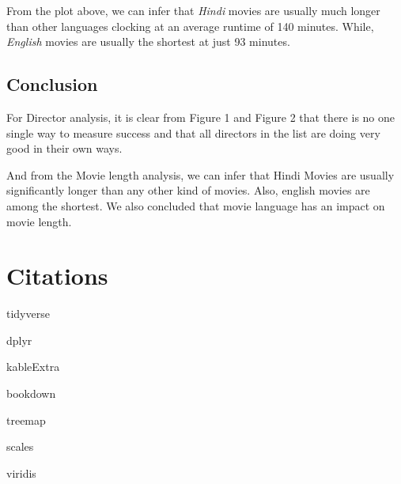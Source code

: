 \documentclass[11pt,a4paper,]{article}
\begin{document}
From the plot above, we can infer that \emph{Hindi} movies are usually much longer than other languages clocking at an average runtime of 140 minutes. While, \emph{English} movies are usually the shortest at just 93 minutes.

\hypertarget{conclusion-1}{%
\subsection{Conclusion}\label{conclusion-1}}

For Director analysis, it is clear from Figure 1 and Figure 2 that there is no one single way to measure success and that all directors in the list are doing very good in their own ways.

And from the Movie length analysis, we can infer that Hindi Movies are usually significantly longer than any other kind of movies. Also, english movies are among the shortest. We also concluded that movie language has an impact on movie length.

\hypertarget{citations}{%
\section{Citations}\label{citations}}

tidyverse \textcite{tidyverse}

dplyr \textcite{dplyr}

kableExtra \textcite{kableExtra}

bookdown \textcite{bookdown}

treemap \textcite{treemap}

scales \textcite{scales}

viridis \textcite{viridis}

\printbibliography
\end{document}
